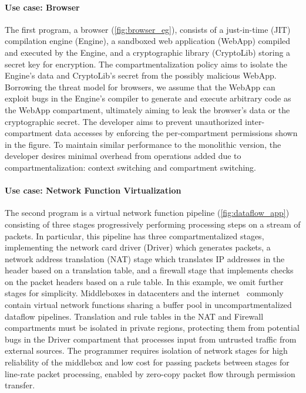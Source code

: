 \paragraph{Use case: Browser}
The first program, a browser (\autoref{fig:browser_eg}), consists of
a just-in-time (JIT) compilation engine (Engine), 
a sandboxed web application (WebApp) compiled and executed by the Engine, and 
a cryptographic library (CryptoLib) storing a secret key for encryption.
The compartmentalization policy aims to isolate the Engine's data
and CryptoLib's secret from the possibly malicious WebApp.
Borrowing the threat model for browsers, we assume that the 
WebApp can exploit bugs in the Engine's compiler to 
generate and execute arbitrary code as the WebApp compartment,
ultimately aiming to leak the browser's data or the cryptographic secret.
The developer aims to prevent unauthorized inter-compartment data accesses
by enforcing the per-compartment permissions shown in the figure.
To maintain similar performance to the monolithic version, the developer
desires minimal overhead from operations added due to compartmentalization:
context switching and compartment switching.

\paragraph{Use case: Network Function Virtualization}
The second program is a virtual network function pipeline 
(\autoref{fig:dataflow_app}) consisting of three stages progressively
performing processing steps on a stream of packets.
In particular, this pipeline has three compartmentalized stages, 
implementing the network card driver (Driver) which
generates packets, 
a network address translation (NAT) stage which translates IP 
addresses in the header based on a translation table, and
a firewall stage that implements checks on the packet headers
based on a rule table.
In this example, we omit further stages for simplicity.
Middleboxes in datacenters and the internet~\cite{MartinsAROHBH14}
commonly contain virtual network functions sharing a buffer pool
in uncompartmentalized dataflow pipelines.
Translation and rule tables in the NAT and Firewall compartments
must be isolated in private regions, protecting them from potential bugs 
in the Driver compartment that processes input from untrusted traffic 
from external sources.
The programmer requires isolation of network stages for high reliability
of the middlebox and low cost for passing packets between stages for 
line-rate packet processing, enabled by zero-copy packet flow 
through permission transfer.


